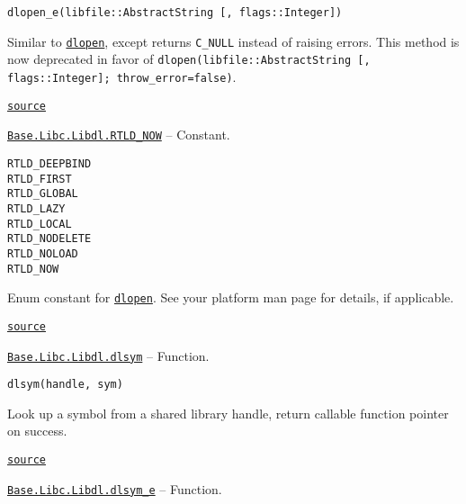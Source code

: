 \begin{adjustwidth}{2em}{0pt}


\begin{verbatim}
dlopen_e(libfile::AbstractString [, flags::Integer])
\end{verbatim}

Similar to \hyperlink{13488184288681759423}{\texttt{dlopen}}, except returns \texttt{C\_NULL} instead of raising errors. This method is now deprecated in favor of \texttt{dlopen(libfile::AbstractString [, flags::Integer]; throw\_error=false)}.



\href{https://github.com/JuliaLang/julia/blob/9058264a69f9efc1af805c4473c946f87859b731/base/libdl.jl#L148-L153}{\texttt{source}}


\end{adjustwidth}
\hypertarget{2891201794066355383}{}
\hyperlink{2891201794066355383}{\texttt{Base.Libc.Libdl.RTLD\_NOW}}  -- {Constant.}

\begin{adjustwidth}{2em}{0pt}


\begin{verbatim}
RTLD_DEEPBIND
RTLD_FIRST
RTLD_GLOBAL
RTLD_LAZY
RTLD_LOCAL
RTLD_NODELETE
RTLD_NOLOAD
RTLD_NOW
\end{verbatim}

Enum constant for \hyperlink{13488184288681759423}{\texttt{dlopen}}. See your platform man page for details, if applicable.



\href{https://github.com/JuliaLang/julia/blob/9058264a69f9efc1af805c4473c946f87859b731/base/libdl.jl#L33-L45}{\texttt{source}}


\end{adjustwidth}
\hypertarget{16428108578964180341}{}
\hyperlink{16428108578964180341}{\texttt{Base.Libc.Libdl.dlsym}}  -- {Function.}

\begin{adjustwidth}{2em}{0pt}


\begin{verbatim}
dlsym(handle, sym)
\end{verbatim}

Look up a symbol from a shared library handle, return callable function pointer on success.



\href{https://github.com/JuliaLang/julia/blob/9058264a69f9efc1af805c4473c946f87859b731/base/libdl.jl#L48-L52}{\texttt{source}}


\end{adjustwidth}
\hypertarget{17445144223909638485}{}
\hyperlink{17445144223909638485}{\texttt{Base.Libc.Libdl.dlsym\_e}}  -- {Function.}


